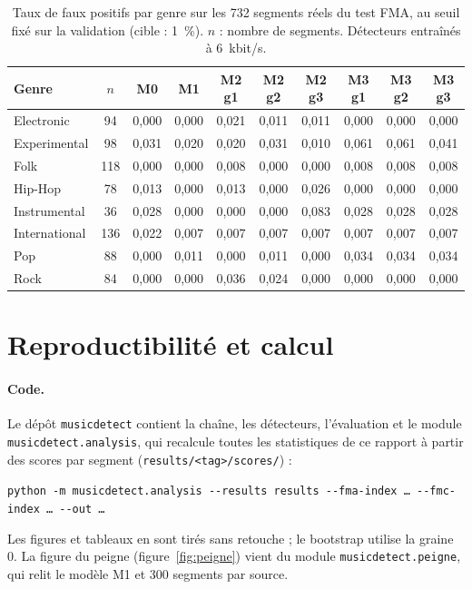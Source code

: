 \documentclass[a4paper, 11pt]{article}
\begin{document}
\begin{table}[H]
    \centering
    \small
    \begin{tabular}{lccccccccc}
        \toprule
        Genre & $n$ & M0 & M1 & M2 g1 & M2 g2 & M2 g3 & M3 g1 & M3 g2 & M3 g3 \\
        \midrule
        Electronic    & 94  & 0,000 & 0,000 & 0,021 & 0,011 & 0,011 & 0,000 & 0,000 & 0,000 \\
        Experimental  & 98  & 0,031 & 0,020 & 0,020 & 0,031 & 0,010 & 0,061 & 0,061 & 0,041 \\
        Folk          & 118 & 0,000 & 0,000 & 0,008 & 0,000 & 0,000 & 0,008 & 0,008 & 0,008 \\
        Hip-Hop       & 78  & 0,013 & 0,000 & 0,013 & 0,000 & 0,026 & 0,000 & 0,000 & 0,000 \\
        Instrumental  & 36  & 0,028 & 0,000 & 0,000 & 0,000 & 0,083 & 0,028 & 0,028 & 0,028 \\
        International & 136 & 0,022 & 0,007 & 0,007 & 0,007 & 0,007 & 0,007 & 0,007 & 0,007 \\
        Pop           & 88  & 0,000 & 0,011 & 0,000 & 0,011 & 0,000 & 0,034 & 0,034 & 0,034 \\
        Rock          & 84  & 0,000 & 0,000 & 0,036 & 0,024 & 0,000 & 0,000 & 0,000 & 0,000 \\
        \bottomrule
    \end{tabular}
    \caption{Taux de faux positifs par genre sur les 732 segments réels du test FMA, au seuil fixé sur la
    validation (cible : 1~\%). $n$ : nombre de segments. Détecteurs entraînés à 6~kbit/s.}
\end{table}

\section{Reproductibilité et calcul}
\label{app:repro}

\paragraph{Code.} Le dépôt \texttt{musicdetect} contient la chaîne, les détecteurs, l'évaluation et le module
\texttt{musicdetect.analysis}, qui recalcule toutes les statistiques de ce rapport à partir des scores par
segment (\texttt{results/<tag>/scores/}) :
\begin{center}
\footnotesize\texttt{python -m musicdetect.analysis -{}-results results -{}-fma-index \dots{} -{}-fmc-index \dots{} -{}-out \dots}
\end{center}
Les figures et tableaux en sont tirés sans retouche ; le bootstrap utilise la graine 0. La figure du peigne
(figure~\ref{fig:peigne}) vient du module \texttt{musicdetect.peigne}, qui relit le modèle M1 et 300 segments
par source.
\end{document}
